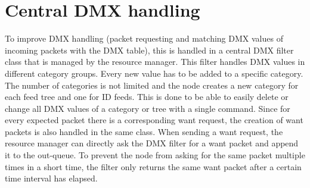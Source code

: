 \section{Central DMX handling}
To improve DMX handling (packet requesting and matching DMX values of incoming packets with the DMX table), this is handled in a central DMX filter class that is managed by the resource manager. This filter handles DMX values in different category groups. Every new value has to be added to a specific category. The number of categories is not limited and the node creates a new category for each feed tree and one for ID feeds. This is done to be able to easily delete or change all DMX values of a category or tree with a single command. Since for every expected packet there is a corresponding want request, the creation of want packets is also handled in the same class. When sending a want request, the resource manager can directly ask the DMX filter for a want packet and append it to the out-queue. To prevent the node from asking for the same packet multiple times in a short time, the filter only returns the same want packet after a certain time interval has elapsed.